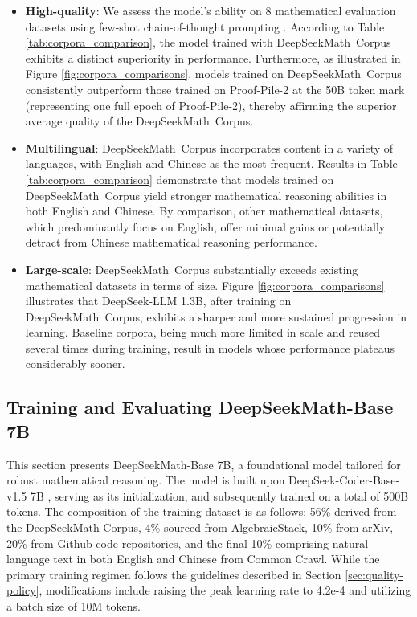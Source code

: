 \begin{itemize}[topsep=0pt]
    \item \textbf{High-quality}:
    We assess the model's ability on 8 mathematical evaluation datasets using few-shot chain-of-thought prompting \cite{cot}. According to Table \ref{tab:corpora_comparison}, the model trained with DeepSeekMath~Corpus exhibits a distinct superiority in performance. Furthermore, as illustrated in Figure \ref{fig:corpora_comparisons}, models trained on DeepSeekMath~Corpus consistently outperform those trained on Proof-Pile-2 at the 50B token mark (representing one full epoch of Proof-Pile-2), thereby affirming the superior average quality of the DeepSeekMath~Corpus.
    \item \textbf{Multilingual}:
    DeepSeekMath~Corpus incorporates content in a variety of languages, with English and Chinese as the most frequent. Results in Table \ref{tab:corpora_comparison} demonstrate that models trained on DeepSeekMath~Corpus yield stronger mathematical reasoning abilities in both English and Chinese. By comparison, other mathematical datasets, which predominantly focus on English, offer minimal gains or potentially detract from Chinese mathematical reasoning performance.
    \item \textbf{Large-scale}:
    DeepSeekMath~Corpus substantially exceeds existing mathematical datasets in terms of size. Figure \ref{fig:corpora_comparisons} illustrates that DeepSeek-LLM 1.3B, after training on DeepSeekMath~Corpus, exhibits a sharper and more sustained progression in learning. Baseline corpora, being much more limited in scale and reused several times during training, result in models whose performance plateaus considerably sooner.
\end{itemize}

\subsection{Training and Evaluating DeepSeekMath-Base 7B}

This section presents DeepSeekMath-Base 7B, a foundational model tailored for robust mathematical reasoning. The model is built upon DeepSeek-Coder-Base-v1.5 7B \citep{deepseek-coder}, serving as its initialization, and subsequently trained on a total of 500B tokens. The composition of the training dataset is as follows: 56\% derived from the DeepSeekMath Corpus, 4\% sourced from AlgebraicStack, 10\% from arXiv, 20\% from Github code repositories, and the final 10\% comprising natural language text in both English and Chinese from Common Crawl. While the primary training regimen follows the guidelines described in Section \ref{sec:quality-policy}, modifications include raising the peak learning rate to 4.2e-4 and utilizing a batch size of 10M tokens.

